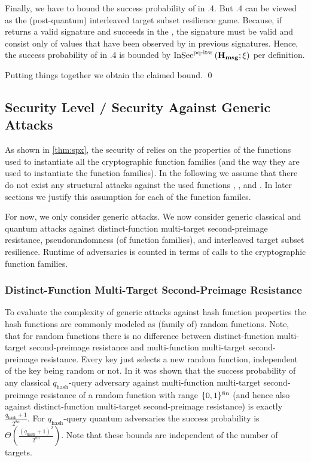 Finally, we have to bound the success probability of \A in \game.4. But \game.4
can be viewed as the (post-quantum) interleaved target subset resilience game.
Because, if \A returns a valid signature and succeeds in the \game, the \fors
signature must be valid and consist only of values that have been observed by
\A in previous signatures. Hence, the success probability of \A in \game.4 is
bounded by ${\mathrm{InSec}}^{{\text{pq-itsr}}}\left( {\mathbf{H_{msg}}}; {\xi} \right) $ per definition.

Putting things together we obtain the claimed bound. \qed

\subsection{Security Level / Security Against Generic Attacks}
As shown in \autoref{thm:spx}, the security of \spx relies on the
properties of the functions used to instantiate all the cryptographic function
families (and the way they are used to instantiate the function families).
In the following we assume that there do not exist any structural attacks
against the used functions \shatwo, \shathree, and \haraka. In later sections
we justify this assumption for each of the function familes.

For now, we only consider generic attacks. We now consider generic
classical and quantum attacks against
distinct-function multi-target second-preimage resistance, pseudorandomness (of
function families), and interleaved target subset resilience. Runtime of
adversaries is counted in terms of calls to the cryptographic function families.

\subsubsection{Distinct-Function Multi-Target Second-Preimage Resistance}
To evaluate the complexity of generic attacks against hash function properties
the hash functions are commonly modeled as (family of) random functions. Note,
that for random functions there is no difference between distinct-function
multi-target second-preimage resistance and multi-function multi-target
second-preimage resistance. Every key just selects a new random function,
independent of the key being random or not.
In \cite{Huelsing2016} it was shown that the success probability of any
classical $q_{\text{hash}}$-query adversary against multi-function multi-target
second-preimage resistance of a random function with range
$\{0,1\}^{8n}$ (and hence also against distinct-function
multi-target second-preimage resistance) is exactly $\frac{q_{\text{hash}}+1}{2^{8n}}$.
For $q_{\text{hash}}$-query quantum adversaries the success probability is
$\Theta(\frac{(q_{\text{hash}}+1)^2}{2^{8n}})$. Note that these bounds are independent
of the number of targets.

